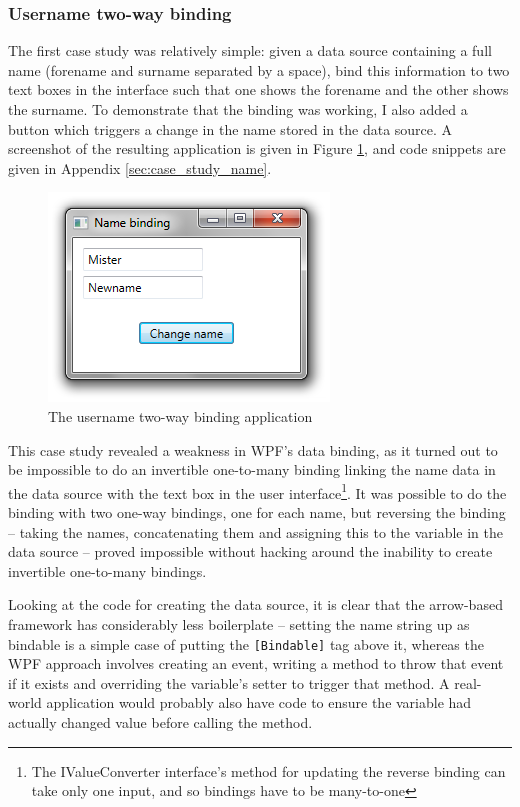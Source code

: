 \documentclass[12pt,twoside,notitlepage]{report}
\begin{document}
\subsubsection{Username two-way binding}

The first case study was relatively simple: given a data source containing a full name (forename and surname separated by a space), bind this information to two text boxes in the interface such that one shows the forename and the other shows the surname. To demonstrate that the binding was working, I also added a button which triggers a change in the name stored in the data source. A screenshot of the resulting application is given in Figure \ref{fig:case_study_name}, and code snippets are given in Appendix \ref{sec:case_study_name}.

\begin{figure}[!ht]
  \centering
  \includegraphics{fig/CaseStudyNameBinding.png}
  \caption{The username two-way binding application}
  \label{fig:case_study_name}
\end{figure}

This case study revealed a weakness in WPF's data binding, as it turned out to be impossible to do an invertible one-to-many binding linking the name data in the data source with the text box in the user interface\footnote{The IValueConverter interface's method for updating the reverse binding can take only one input, and so bindings have to be many-to-one}. It was possible to do the binding with two one-way bindings, one for each name, but reversing the binding -- taking the names, concatenating them and assigning this to the variable in the data source -- proved impossible without hacking around the inability to create invertible one-to-many bindings.

Looking at the code for creating the data source, it is clear that the arrow-based framework has considerably less boilerplate -- setting the name string up as bindable is a simple case of putting the \texttt{[Bindable]} tag above it, whereas the WPF approach involves creating an event, writing a method to throw that event if it exists and overriding the variable's setter to trigger that method. A real-world application would probably also have code to ensure the variable had actually changed value before calling the method.
\end{document}

